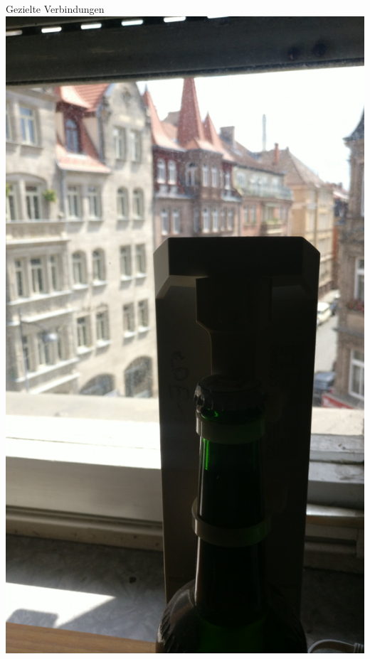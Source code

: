 \documentclass{beamer}
\begin{document}
	\begin{frame}[standout]{Gezielte Verbindungen}
		\includegraphics[height=0.75\framewidth]{media/p2p-flasche2.jpg}
	\end{frame}
\end{document}
